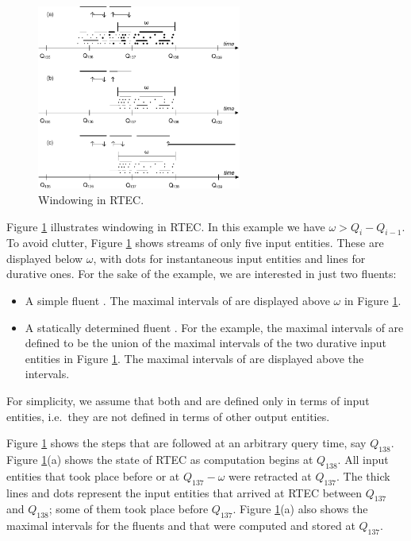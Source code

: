 \begin{figure}[t]
	\centering
		\includegraphics[width=0.6\textwidth]{figures/caching-EC}
	\caption{Windowing in RTEC.}
	\label{fig:rtec-abc}
\end{figure}

Figure \ref{fig:rtec-abc} illustrates windowing in RTEC. In this example we have  $\omega{>}Q_i{-}Q_{i-1}$. To avoid clutter, Figure \ref{fig:rtec-abc} shows streams of only five input entities. These are displayed below $\omega$, with dots for instantaneous input entities and lines for durative ones. For the sake of the example, we are interested in just two fluents:
%
\begin{itemize}
 \item A simple fluent . The maximal intervals of  are displayed above $\omega$ in Figure \ref{fig:rtec-abc}.
 
 \item A statically determined fluent . For the example, the maximal intervals of  are defined to be the union of the maximal intervals of the two durative input entities in Figure \ref{fig:rtec-abc}.  The maximal intervals of  are displayed above the  intervals.
\end{itemize}
%
For simplicity, we assume that both  and  are defined only in terms of input entities, i.e.~they are not defined in terms of other output entities.

Figure \ref{fig:rtec-abc} shows the steps that are followed at an arbitrary query time, say $Q_{138}$. Figure \ref{fig:rtec-abc}(a) shows the state of RTEC as computation begins at $Q_{138}$. All input entities that took place before or at $Q_{137}{-}\omega$ were retracted at $Q_{137}$. The thick lines and dots represent the input entities that arrived at RTEC between $Q_{137}$ and $Q_{138}$; some of them took place before $Q_{137}$. Figure \ref{fig:rtec-abc}(a) also shows the maximal intervals for the fluents  and  that were computed and stored at $Q_{137}$.

